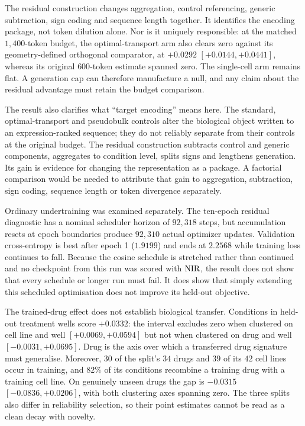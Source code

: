 The residual construction changes aggregation, control referencing, generic subtraction, sign
coding and sequence length together. It identifies the encoding package, not token dilution alone.
Nor is it uniquely responsible: at the matched $1{,}400$-token budget, the optimal-transport arm
also clears zero against its geometry-defined orthogonal comparator, at $+0.0292$
\nolinebreak[3]$[+0.0144,+0.0441]$, whereas its original $600$-token estimate spanned zero. The
single-cell arm remains flat. A generation cap can therefore manufacture a null, and any claim
about the residual advantage must retain the budget comparison.

The result also clarifies what ``target encoding'' means here. The standard,
optimal-transport and pseudobulk controls alter the biological object written to an
expression-ranked sequence; they do not reliably separate from their controls at the original
budget. The residual construction subtracts control and generic components, aggregates to
condition level, splits signs and lengthens generation. Its gain is evidence for changing the
representation as a package. A factorial comparison would be needed to attribute that gain to
aggregation, subtraction, sign coding, sequence length or token divergence separately.

Ordinary undertraining was examined separately. The ten-epoch residual diagnostic has a nominal
scheduler horizon of $92{,}318$ steps, but accumulation resets at epoch boundaries produce
$92{,}310$ actual optimizer updates. Validation cross-entropy is best after epoch 1 ($1.9199$) and
ends at $2.2568$ while training loss continues to fall. Because the cosine schedule is stretched
rather than continued and no checkpoint from this run was scored with $\textrm{NIR}$, the result does not
show that every schedule or longer run must fail. It does show that simply extending this scheduled
optimisation does not improve its held-out objective.

The trained-drug effect does not establish biological transfer. Conditions in held-out treatment
wells score $+0.0332$: the interval excludes zero when clustered on cell line and well
\nolinebreak[3]$[+0.0069,+0.0594]$ but not when clustered on drug and well
\nolinebreak[3]$[-0.0031,+0.0695]$. Drug is the axis over which a transferred drug signature must
generalise. Moreover, $30$ of the split's $34$ drugs and $39$ of its $42$ cell lines occur in
training, and $82\%$ of its conditions recombine a training drug with a training cell line. On
genuinely unseen drugs the gap is $-0.0315$ \nolinebreak[3]$[-0.0836,+0.0206]$, with both clustering
axes spanning zero. The three splits also differ in reliability selection, so their point estimates
cannot be read as a clean decay with novelty.

